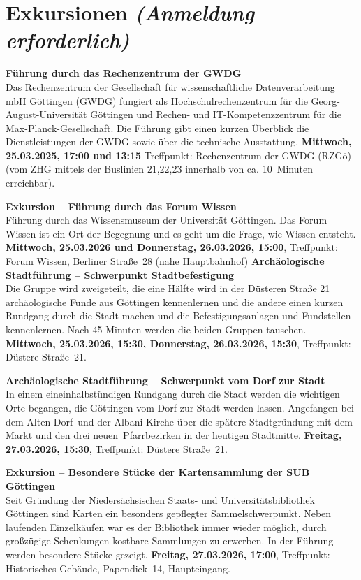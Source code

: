 \section*{Exkursionen {\normalfont\em (Anmeldung erforderlich)}}\label{exkursionen}
\noindent
{\large \bfseries Führung durch das Rechenzentrum der GWDG}\\
Das Rechenzentrum der Gesellschaft für wissenschaftliche Datenverarbeitung mbH Göttingen (GWDG) fungiert als Hochschulrechenzentrum für die Georg-August-Universität Göttingen und Rechen- und IT-Kompetenzzentrum für die Max-Planck-Gesell\-schaft. Die Führung gibt einen kurzen Überblick die Dienstleistungen der GWDG sowie über die technische Ausstattung.
 {\bfseries Mittwoch, 25.03.2025, 17:00 und 13:15} Treffpunkt: Rechenzentrum der GWDG (RZGö) (vom ZHG mittels der Buslinien 21,22,23 innerhalb von ca. 10~Minuten erreichbar).
\bigskip

\noindent
{\large \bfseries Exkursion -- Führung durch das Forum Wissen}\\
Führung durch das Wissensmuseum der Universität Göttingen. Das Forum Wissen ist ein Ort der Begegnung und es geht um die Frage, wie Wissen entsteht.
{\bfseries Mittwoch, 25.03.2026 und Donnerstag, 26.03.2026, 15:00}, Treffpunkt: Forum Wissen, Berliner Straße~28 (nahe Hauptbahnhof)
\newpage
\noindent
{\large \bfseries Archäologische Stadtführung -- Schwerpunkt Stadtbefestigung}\\
Die Gruppe wird zweigeteilt, die eine Hälfte wird in der Düsteren Straße 21 archäologische Funde aus Göttingen kennenlernen und die andere einen kurzen Rundgang durch die Stadt machen und die Befestigungsanlagen und Fundstellen kennenlernen. Nach 45 Minuten werden die beiden Gruppen tauschen. {\bfseries Mittwoch, 25.03.2026, 15:30,
Donnerstag, 26.03.2026, 15:30}, Treffpunkt: Düstere Straße~21.
\bigskip

\noindent
{\large \bfseries Archäologische Stadtführung -- Schwerpunkt vom Dorf zur Stadt}\\
In einem eineinhalbstündigen Rundgang durch die Stadt werden die wichtigen Orte begangen, die Göttingen vom Dorf zur Stadt werden lassen. Angefangen bei dem \glqq Alten Dorf\grqq\  und der Albani Kirche über die spätere Stadtgründung mit dem Markt und den drei \glqq neuen\grqq\  Pfarrbezirken in der heutigen Stadtmitte. {\bfseries Freitag, 27.03.2026, 15:30}, Treffpunkt: Düstere Straße~21.
\bigskip

\newpage
\noindent
{\large \bfseries Exkursion -- Besondere Stücke der Kartensammlung der SUB Göttingen}\\
Seit Gründung der Niedersächsischen Staats- und Universitätsbibliothek Göttingen sind Karten ein besonders gepflegter Sammelschwerpunkt. Neben laufenden Einzelkäufen war es der Bibliothek immer wieder möglich, durch großzügige Schenkungen kostbare Sammlungen zu erwerben. In der Führung werden besondere Stücke gezeigt. {\bfseries Freitag, 27.03.2026, 17:00}, Treffpunkt: Historisches Gebäude, Papendiek~14, Haupteingang.
\bigskip

